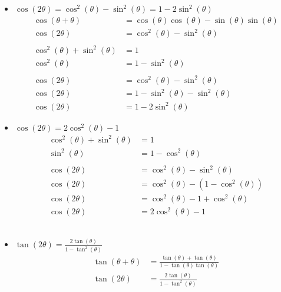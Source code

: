 \documentclass[12pt]{article}
\begin{document}
\begin{itemize}
    \item $\cos(2 \theta) = \cos^2(\theta) - \sin^2(\theta) = 1 - 2\sin^2(\theta)$
        \begin{align*}
            \cos(\theta + \theta) &= \cos(\theta) \cos(\theta) - \sin(\theta) \sin(\theta) \\
            \cos(2 \theta) &= \cos^2(\theta) - \sin^2 (\theta)  \tag*{$\square$}\\ \\
            \cos^2(\theta) + \sin^2(\theta) &= 1 \\
            \cos^2(\theta) &= 1 - \sin^2(\theta) \\ \\
            \cos(2 \theta) &= \cos^2(\theta) - \sin^2 (\theta) \\
            \cos(2 \theta) &= 1 - \sin^2(\theta) - \sin^2 (\theta) \\
            \cos(2 \theta) &= 1 - 2\sin^2(\theta) \tag*{$\square$}
        \end{align*}


    \item $\cos(2 \theta) = 2\cos^2(\theta) - 1$
        \begin{align*}
            \cos^2(\theta) + \sin^2(\theta) &= 1 \\
            \sin^2(\theta) &= 1 - \cos^2(\theta) \\ \\
            \cos(2 \theta) &= \cos^2(\theta) - \sin^2 (\theta) \\
            \cos(2 \theta) &= \cos^2(\theta) - (1 - \cos^2(\theta)) \\
            \cos(2 \theta) &= \cos^2(\theta) - 1 + \cos^2(\theta) \\
            \cos(2 \theta) &= 2\cos^2(\theta) - 1 \tag*{$\square$}
        \end{align*}
            \\

    \item $\tan(2 \theta) = \frac{2\tan(\theta)}{1 - \tan^2(\theta)}$
        \begin{align*}
            \tan(\theta + \theta) &= \frac{\tan(\theta) + \tan(\theta)}{1 - \tan(\theta)\tan(\theta)} \\
            \tan(2 \theta) &= \frac{2\tan(\theta)}{1 - \tan^2(\theta)} \tag*{$\square$}
        \end{align*}
            \\


\end{itemize}
\end{document}
